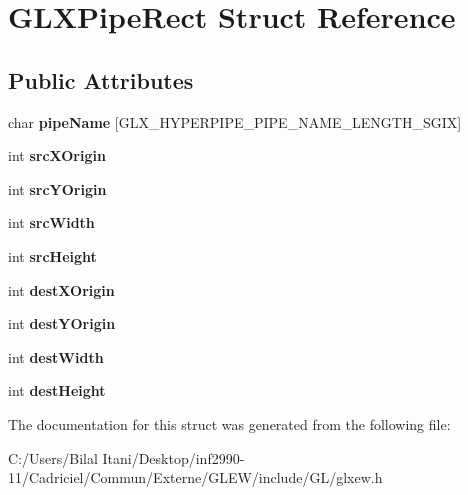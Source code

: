 \hypertarget{struct_g_l_x_pipe_rect}{}\section{G\+L\+X\+Pipe\+Rect Struct Reference}
\label{struct_g_l_x_pipe_rect}
\subsection*{Public Attributes}
\begin{DoxyCompactItemize}
\item 
char {\bfseries pipe\+Name} \mbox{[}G\+L\+X\+\_\+\+H\+Y\+P\+E\+R\+P\+I\+P\+E\+\_\+\+P\+I\+P\+E\+\_\+\+N\+A\+M\+E\+\_\+\+L\+E\+N\+G\+T\+H\+\_\+\+S\+G\+IX\mbox{]}\hypertarget{struct_g_l_x_pipe_rect_aa4c4f60e9647705ddefa10f95a37cb79}{}\label{struct_g_l_x_pipe_rect_aa4c4f60e9647705ddefa10f95a37cb79}

\item 
int {\bfseries src\+X\+Origin}\hypertarget{struct_g_l_x_pipe_rect_a9df2313c01f75d149e64f2ff467bc266}{}\label{struct_g_l_x_pipe_rect_a9df2313c01f75d149e64f2ff467bc266}

\item 
int {\bfseries src\+Y\+Origin}\hypertarget{struct_g_l_x_pipe_rect_a1f7316dff7050ab2ce9d3d37f8c5450e}{}\label{struct_g_l_x_pipe_rect_a1f7316dff7050ab2ce9d3d37f8c5450e}

\item 
int {\bfseries src\+Width}\hypertarget{struct_g_l_x_pipe_rect_a2c6c180a4dabb71076366e06a1c7d0ef}{}\label{struct_g_l_x_pipe_rect_a2c6c180a4dabb71076366e06a1c7d0ef}

\item 
int {\bfseries src\+Height}\hypertarget{struct_g_l_x_pipe_rect_a35632524bce6bffa05f284a9b1c1b8ff}{}\label{struct_g_l_x_pipe_rect_a35632524bce6bffa05f284a9b1c1b8ff}

\item 
int {\bfseries dest\+X\+Origin}\hypertarget{struct_g_l_x_pipe_rect_a8b7b941894ad3420326d7e9fa885bb71}{}\label{struct_g_l_x_pipe_rect_a8b7b941894ad3420326d7e9fa885bb71}

\item 
int {\bfseries dest\+Y\+Origin}\hypertarget{struct_g_l_x_pipe_rect_aef7766b02ef07c20a11e89da5878b469}{}\label{struct_g_l_x_pipe_rect_aef7766b02ef07c20a11e89da5878b469}

\item 
int {\bfseries dest\+Width}\hypertarget{struct_g_l_x_pipe_rect_a3c07991d2a8fb6e973eae834650b3dad}{}\label{struct_g_l_x_pipe_rect_a3c07991d2a8fb6e973eae834650b3dad}

\item 
int {\bfseries dest\+Height}\hypertarget{struct_g_l_x_pipe_rect_a858b0ea6642e451495aff35cfefbd083}{}\label{struct_g_l_x_pipe_rect_a858b0ea6642e451495aff35cfefbd083}

\end{DoxyCompactItemize}


The documentation for this struct was generated from the following file\+:\begin{DoxyCompactItemize}
\item 
C\+:/\+Users/\+Bilal Itani/\+Desktop/inf2990-\/11/\+Cadriciel/\+Commun/\+Externe/\+G\+L\+E\+W/include/\+G\+L/glxew.\+h\end{DoxyCompactItemize}
